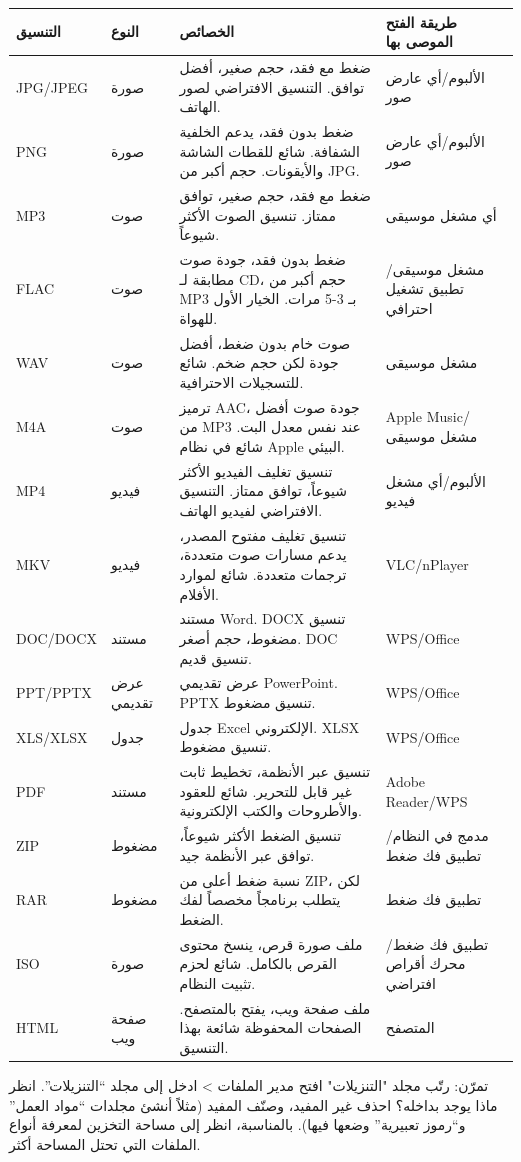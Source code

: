 \begin{center}
\begin{tabularx}{\linewidth}{|X|X|X|X|}
\hline
\textbf{التنسيق} & \textbf{النوع} & \textbf{الخصائص} & \textbf{طريقة الفتح الموصى بها} \tabularnewline
\hline
JPG/JPEG & صورة & ضغط مع فقد، حجم صغير، أفضل توافق. التنسيق الافتراضي لصور الهاتف. & الألبوم/أي عارض صور \tabularnewline
PNG & صورة & ضغط بدون فقد، يدعم الخلفية الشفافة. شائع للقطات الشاشة والأيقونات. حجم أكبر من JPG. & الألبوم/أي عارض صور \tabularnewline
MP3 & صوت & ضغط مع فقد، حجم صغير، توافق ممتاز. تنسيق الصوت الأكثر شيوعاً. & أي مشغل موسيقى \tabularnewline
FLAC & صوت & ضغط بدون فقد، جودة صوت مطابقة لـ CD، حجم أكبر من MP3 بـ 3-5 مرات. الخيار الأول للهواة. & مشغل موسيقى/تطبيق تشغيل احترافي \tabularnewline
WAV & صوت & صوت خام بدون ضغط، أفضل جودة لكن حجم ضخم. شائع للتسجيلات الاحترافية. & مشغل موسيقى \tabularnewline
M4A & صوت & ترميز AAC، جودة صوت أفضل من MP3 عند نفس معدل البت. شائع في نظام Apple البيئي. & Apple Music/مشغل موسيقى \tabularnewline
MP4 & فيديو & تنسيق تغليف الفيديو الأكثر شيوعاً، توافق ممتاز. التنسيق الافتراضي لفيديو الهاتف. & الألبوم/أي مشغل فيديو \tabularnewline
MKV & فيديو & تنسيق تغليف مفتوح المصدر، يدعم مسارات صوت متعددة، ترجمات متعددة. شائع لموارد الأفلام. & VLC/nPlayer \tabularnewline
DOC/DOCX & مستند & مستند Word. DOCX تنسيق مضغوط، حجم أصغر. DOC تنسيق قديم. & WPS/Office \tabularnewline
PPT/PPTX & عرض تقديمي & عرض تقديمي PowerPoint. PPTX تنسيق مضغوط. & WPS/Office \tabularnewline
XLS/XLSX & جدول & جدول Excel الإلكتروني. XLSX تنسيق مضغوط. & WPS/Office \tabularnewline
PDF & مستند & تنسيق عبر الأنظمة، تخطيط ثابت غير قابل للتحرير. شائع للعقود والأطروحات والكتب الإلكترونية. & Adobe Reader/WPS \tabularnewline
ZIP & مضغوط & تنسيق الضغط الأكثر شيوعاً، توافق عبر الأنظمة جيد. & مدمج في النظام/تطبيق فك ضغط \tabularnewline
RAR & مضغوط & نسبة ضغط أعلى من ZIP، لكن يتطلب برنامجاً مخصصاً لفك الضغط. & تطبيق فك ضغط \tabularnewline
ISO & صورة & ملف صورة قرص، ينسخ محتوى القرص بالكامل. شائع لحزم تثبيت النظام. & تطبيق فك ضغط/محرك أقراص افتراضي \tabularnewline
HTML & صفحة ويب & ملف صفحة ويب، يفتح بالمتصفح. الصفحات المحفوظة شائعة بهذا التنسيق. & المتصفح \tabularnewline
\hline
\end{tabularx}
\end{center}

\begin{tcbpractice}{تمرّن: رتّب مجلد "التنزيلات"}
افتح مدير الملفات > ادخل إلى مجلد “التنزيلات”. انظر ماذا يوجد بداخله؟ احذف غير المفيد، وصنّف المفيد (مثلاً أنشئ مجلدات “مواد العمل” و“رموز تعبيرية” وضعها فيها). بالمناسبة، انظر إلى مساحة التخزين لمعرفة أنواع الملفات التي تحتل المساحة أكثر.

\end{tcbpractice}

